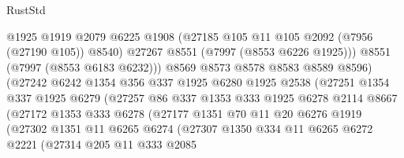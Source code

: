 \begin{lexlean}{RustStd}
\begin{coremodule}
{\begin{coremodule}
{{{{{{{{{{{{{{{{{{{{{{{{{{{{{{{{{{{{{{{{{{{                              @1925
                              @1919
                              @2079
                              @6225
                              @1908
                              (@27185 @105 @11 @105 @2092 (@7956 (@27190 @105)) @8540)
                              @27267
                              @8551
                              (@7997 (@8553 @6226 @1925)))
                            @8551
                            (@7997 (@8553 @6183 @6232)))
                          @8569
                          @8573
                          @8578
                          @8583
                          @8589
                          @8596)
                        (@27242
                          @6242
                          @1354
                          @356
                          @337
                          @1925
                          @6280
                          @1925
                          @2538
                          (@27251
                            @1354
                            @337
                            @1925
                            @6279
                            (@27257
                              @86
                              @337
                              @1353
                              @333
                              @1925
                              @6278
                              @2114
                              @8667
                              (@27172
                                @1353
                                @333
                                @6278
                                (@27177
                                  @1351
                                  @70
                                  @11
                                  @20
                                  @6276
                                  @1919
                                  (@27302
                                    @1351
                                    @11
                                    @6265
                                    @6274
                                    (@27307
                                      @1350
                                      @334
                                      @11
                                      @6265
                                      @6272
                                      @2221
                                      (@27314
                                        @205
                                        @11
                                        @333
                                        @2085
}}}}}}}}}}}}}}}}}}}}}}}}}}}}}}}}}}}}}}}}}}}
\end{coremodule}}
\end{coremodule}
\end{lexlean}
